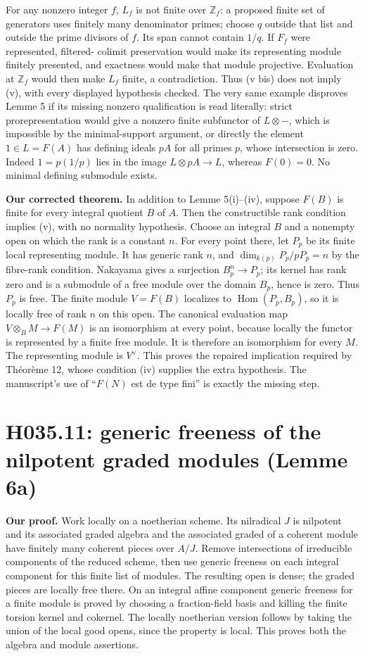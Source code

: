 For any nonzero integer $f$, $L_f$ is not finite over $\mathbb Z_f$:
a proposed finite set of generators uses finitely many denominator
primes; choose $q$ outside that list and outside the prime divisors of
$f$. Its span cannot contain $1/q$. If $F_f$ were represented, filtered-
colimit preservation would make its representing module finitely
presented, and exactness would make that module projective. Evaluation
at $\mathbb Z_f$ would then make $L_f$ finite, a contradiction. Thus
(v bis) does not imply (v), with every displayed hypothesis checked.
The very same example disproves Lemme 5 if its missing nonzero
qualification is read literally: strict prorepresentation would give
a nonzero finite subfunctor of $L\otimes-$, which is impossible by
the minimal-support argument, or directly the element $1\in L=F(A)$
has defining ideals $pA$ for all primes $p$, whose intersection is zero.
Indeed $1=p(1/p)$ lies in the image $L\otimes pA\to L$, whereas
$F(0)=0$. No minimal defining submodule exists.

\textbf{Our corrected theorem.} In addition to Lemme 5(i)--(iv), suppose
$F(B)$ is finite for every integral quotient $B$ of $A$. Then the
constructible rank condition implies (v), with no normality hypothesis.
Choose an integral $B$ and a nonempty open on which the rank is a
constant $n$. For every point there, let $P_p$ be its finite local
representing module. It has generic rank $n$, and
$\dim_{k(p)}P_p/pP_p=n$ by the fibre-rank condition. Nakayama gives
a surjection $B_p^n\to P_p$; its kernel has rank zero and is a
submodule of a free module over the domain $B_p$, hence is zero.
Thus $P_p$ is free. The finite module $V=F(B)$ localizes to
$\operatorname{Hom}(P_p,B_p)$, so it is locally free of rank $n$
on this open. The canonical evaluation map
$V\otimes_B M\to F(M)$ is an isomorphism at every point, because
locally the functor is represented by a finite free module. It is
therefore an isomorphism for every $M$. The representing module is
$V^\vee$. This proves the repaired implication required by Théorème 12,
whose condition (iv) supplies the extra hypothesis. The manuscript's
use of ``$F(N)$ est de type fini'' is exactly the missing step.

\section{H035.11: generic freeness of the nilpotent graded modules (Lemme 6a)}
\textbf{Our proof.} Work locally on a noetherian scheme. Its nilradical
$J$ is nilpotent and its associated graded algebra and the associated
graded of a coherent module have finitely many coherent pieces over
$A/J$. Remove intersections of irreducible components of the reduced
scheme, then use generic freeness on each integral component for this
finite list of modules. The resulting open is dense; the graded pieces
are locally free there. On an integral affine component generic freeness
for a finite module is proved by choosing a fraction-field basis and
killing the finite torsion kernel and cokernel. The locally noetherian
version follows by taking the union of the local good opens, since the
property is local. This proves both the algebra and module assertions.

